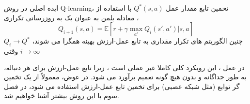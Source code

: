 ایده اصلی در روش Q-learning، تخمین تابع مقدار عمل  
$Q^*(s,a)$ 
با استفاده از معادله بلمن به عنوان یک به روزرسانی تکراری ،
$$Q_{i+1}(s,a) = \mathbb{E}[r+ \gamma \max_{a'} Q_i(s',a')|s,a]$$
چنین الگوریتم های تکرار مقداری به تابع عمل-ارزش بهینه همگرا می شوند، 
$Q_i \longrightarrow Q^*$
وقتی
$i \longrightarrow \infty$

در عمل ، این رویکرد کلی کاملا غیر عملی است ،
زیرا تابع عمل-ارزش برای هر دنباله، به طور جداگانه و بدون هیچ گونه تعمیم برآورد می شود. در عوض، معمولاً از یک تخمین گر توابع (مثل شبکه عصبی) برای تخمین تابع عمل-ارزش استفاده می شود، در فصل سوم با این روش بیشتر آشنا خواهیم شد.